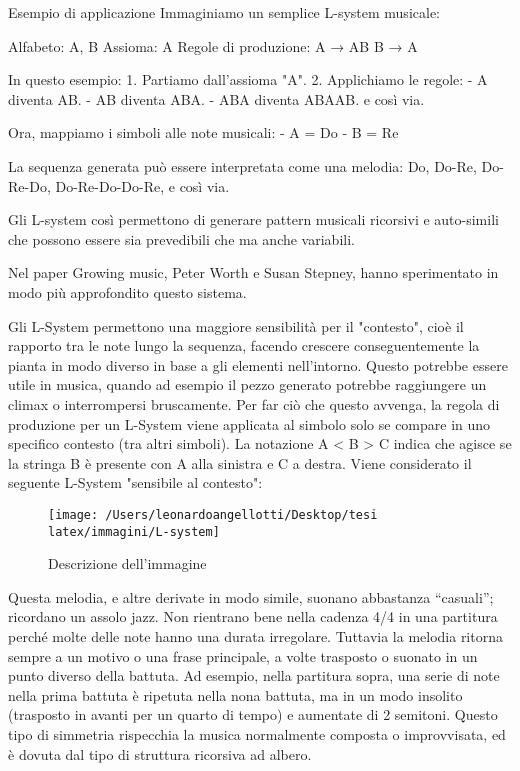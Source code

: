\documentclass[a4paper,12pt]{report}
\begin{document}
Esempio di applicazione
Immaginiamo un semplice L-system musicale:

Alfabeto: {A, B}
Assioma: A
Regole di produzione: 
  A → AB
  B → A

In questo esempio:
1. Partiamo dall'assioma "A".
2. Applichiamo le regole:
   - A diventa AB.
   - AB diventa ABA.
   - ABA diventa ABAAB.
   e così via.

Ora, mappiamo i simboli alle note musicali:
- A = Do
- B = Re

La sequenza generata può essere interpretata come una melodia: Do, Do-Re, Do-Re-Do, Do-Re-Do-Do-Re, e così via.

Gli L-system così permettono di generare pattern musicali ricorsivi e auto-simili che possono essere sia prevedibili che ma anche variabili. 

Nel paper Growing music, Peter Worth e Susan Stepney, hanno sperimentato in modo più approfondito questo sistema.

Gli L-System permettono una maggiore sensibilità per il "contesto", cioè il rapporto tra le note lungo la sequenza, 
facendo crescere conseguentemente la pianta in modo diverso in base a gli elementi nell'intorno.
Questo potrebbe essere utile in musica, quando ad esempio il pezzo generato potrebbe raggiungere un climax o interrompersi bruscamente. 
Per far ciò che questo avvenga, la regola di produzione per un L-System viene applicata al simbolo solo se compare in uno specifico
contesto (tra altri simboli). 
La notazione A < B > C indica che agisce se la stringa B è presente con A alla sinistra e C a destra.
Viene considerato il seguente L-System "sensibile al contesto":

\begin{figure}[h!]
    \centering
    \texttt{[image: /Users/leonardoangellotti/Desktop/tesi latex/immagini/L-system]} 
    \caption{Descrizione dell'immagine}
    \label{fig:immagine}
\end{figure}

Questa melodia, e altre derivate in modo simile, suonano abbastanza “casuali”; ricordano un assolo jazz. 
Non rientrano bene nella cadenza 4/4 in una partitura perché molte delle note hanno una durata irregolare. 
Tuttavia la melodia ritorna sempre a un motivo o una frase principale, 
a volte trasposto o suonato in un punto diverso della battuta. 
Ad esempio, nella partitura sopra, una serie di note nella prima battuta è ripetuta nella nona battuta, ma in un modo insolito (trasposto in avanti per un quarto di tempo) e aumentate di 2 semitoni. 
Questo tipo di simmetria rispecchia la musica normalmente composta o improvvisata, ed è dovuta dal tipo di struttura ricorsiva ad albero.
\end{document}
